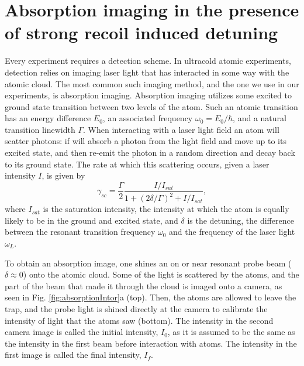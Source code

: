 \documentclass[12pt]{iopart}
\begin{document}
\section{Absorption imaging in the presence of strong recoil induced detuning}
Every experiment requires a detection scheme. In ultracold atomic experiments, detection relies on imaging laser light that has interacted in some way with the atomic cloud. The most common such imaging method, and the one we use in our experiments, is absorption imaging. Absorption imaging utilizes some excited to ground state transition between two levels of the atom. Such an atomic transition has an energy difference $E_0$, an associated frequency $\omega_0 = E_0/\hbar$, and a natural transition linewidth $\Gamma$. When interacting with a laser light field an atom will scatter photons: if will absorb a photon from the light field and move up to its excited state, and then re-emit the photon in a random direction and decay back to its ground state. The  rate at which this scattering occurs, given a laser intensity $I$, is given by
\begin{equation}
\gamma_{sc}= \frac{\Gamma}{2} \frac{I/I_{sat}}{1+(2\delta/\Gamma)^2 +I/I_{sat}}, 
\label{eq:scatrate}
\end{equation}
where $I_{sat}$ is the saturation intensity, the intensity at which the atom is equally likely to be in the ground and excited state, and $\delta$ is the detuning, the difference between the resonant transition frequency $\omega_0$ and the frequency of the laser light $\omega_L$.  
\par To obtain an absorption image, one shines an on or near resonant probe beam ($\delta\approx0$) onto the atomic cloud. Some of the light is scattered by the atoms, and the part of the beam that made it through the cloud is imaged onto a camera, as seen in Fig. \ref{fig:absorptionIntor}a (top). Then, the atoms are allowed to leave the trap, and the probe light is shined directly at the camera to calibrate the intensity of light that the atoms saw (bottom). The intensity in the second camera image is called the initial intensity, $I_{0}$, as it is assumed to be the same as the intensity in the first beam before interaction with atoms. The intensity in the first image is called the final intensity, $I_f$.  
\end{document}

